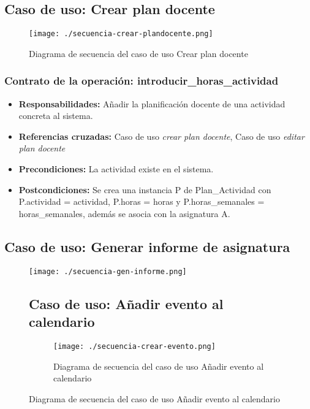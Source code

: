 \subsection{Caso de uso: Crear plan docente}
\begin{figure}[H] 
  \label{comportamiento-crear-plandocente} 
	\begin{center}
    \texttt{[image: ./secuencia-crear-plandocente.png]}
  \end{center}
\caption{Diagrama de secuencia del caso de uso Crear plan docente}
\end{figure}

\subsubsection{Contrato de la operación: introducir\_horas\_actividad}
\begin{itemize}
\item {\bf Responsabilidades:} Añadir la planificación docente de una actividad concreta al sistema.
\item {\bf Referencias cruzadas:} Caso de uso {\em crear plan docente}, Caso de uso {\em editar plan docente}
\item {\bf Precondiciones:} La actividad existe en el sistema.
\item {\bf Postcondiciones:} Se crea una instancia P de Plan\_Actividad con P.actividad = actividad, P.horas = horas y  P.horas\_semanales = horas\_semanales, además se asocia con la asignatura A.
\end{itemize}

\subsection{Caso de uso: Generar informe de asignatura}
\begin{figure}[H] 
  \label{comportamiento-generar-informe} 
	\begin{center}
    \texttt{[image: ./secuencia-gen-informe.png]}
  \end{center}
\caption{Diagrama de secuencia del caso de uso Generar informe de asignatura}

\subsection{Caso de uso: Añadir evento al calendario}
\begin{figure}[H] 
  \label{comportamiento-anadir-evento} 
	\begin{center}
    \texttt{[image: ./secuencia-crear-evento.png]}
  \end{center}
\caption{Diagrama de secuencia del caso de uso Añadir evento al calendario}
\end{figure}
\end{figure}

